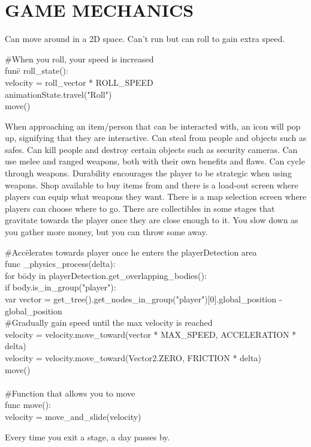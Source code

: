 \documentclass{article}
\begin{document}
\section{GAME MECHANICS \label{mechanics}}
Can move around in a 2D space. Can't run but can roll to gain extra speed.
\bigbreak
\begin{tabbing}
\#When you roll, your speed is increased\\
fun\= c roll\_state():\\
\>	velocity = roll\_vector * ROLL\_SPEED\\
\>	animationState.travel("Roll")\\
\>	move()\\
\end{tabbing}
\bigbreak
When approaching an item/person that can be interacted with, an icon will pop up, signifying that they are interactive. Can steal from people and objects such as safes. Can kill people and destroy certain objects such as security cameras. Can use melee and ranged weapons, both with their own benefits and flaws. Can cycle through weapons. Durability encourages the player to be strategic when using weapons. Shop available to buy items from and there is a load-out screen where players can equip what weapons they want. There is a map selection screen where players can choose where to go. There are collectibles in some stages that gravitate towards the player once they are close enough to it. You slow down as you gather more money, but you can throw some away.
\bigbreak
\begin{tabbing}
\#Acc\=elerates towards player once he enters the playerDetection area\\
func \_physics\_process(delta):\\
\> for  b\= ody in playerDetection.get\_overlapping\_bodies():\\
\> \> if bo\=dy.is\_in\_group("player"):\\
\> \> \> var vector = get\_tree().get\_nodes\_in\_group("player")[0].global\_position - global\_position\\
\> \> \> \#Gradually gain speed until the max velocity is reached\\
\> \> \> velocity = velocity.move\_toward(vector * MAX\_SPEED, ACCELERATION * delta) \\
\> velocity = velocity.move\_toward(Vector2.ZERO, FRICTION * delta)\\
\> move()\\ \\
\#Function that allows you to move\\
func move():\\
\> velocity = move\_and\_slide(velocity)
\end{tabbing}
\bigbreak
Every time you exit a stage, a day passes by.
\end{document}
